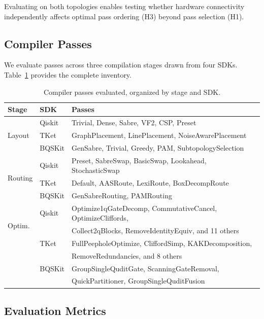 \documentclass[conference]{IEEEtran}
\begin{document}
Evaluating on both topologies enables testing whether hardware connectivity independently affects optimal pass ordering (H3) beyond pass selection (H1).

\subsection{Compiler Passes}
\label{subsec:passes}

We evaluate passes across three compilation stages drawn from four SDKs.
Table~\ref{tab:passes} provides the complete inventory.

\begin{table}[t]
\centering
\caption{Compiler passes evaluated, organized by stage and SDK.}
\label{tab:passes}
\begin{tabular}{lll}
\toprule
\textbf{Stage} & \textbf{SDK} & \textbf{Passes} \\
\midrule
\multirow{3}{*}{Layout} & Qiskit & Trivial, Dense, Sabre, VF2, CSP, Preset \\
 & TKet & GraphPlacement, LinePlacement, NoiseAwarePlacement \\
 & BQSKit & GenSabre, Trivial, Greedy, PAM, SubtopologySelection \\
\midrule
\multirow{3}{*}{Routing} & Qiskit & Preset, SabreSwap, BasicSwap, Lookahead, StochasticSwap \\
 & TKet & Default, AASRoute, LexiRoute, BoxDecompRoute \\
 & BQSKit & GenSabreRouting, PAMRouting \\
\midrule
\multirow{3}{*}{Optim.} & Qiskit & Optimize1qGateDecomp, CommutativeCancel, OptimizeCliffords, \\
 & & Collect2qBlocks, RemoveIdentityEquiv, and 11 others \\
 & TKet & FullPeepholeOptimize, CliffordSimp, KAKDecomposition, \\
 & & RemoveRedundancies, and 8 others \\
 & BQSKit & GroupSingleQuditGate, ScanningGateRemoval, \\
 & & QuickPartitioner, GroupSingleQuditFusion \\
\bottomrule
\end{tabular}
\end{table}

\subsection{Evaluation Metrics}
\end{document}
